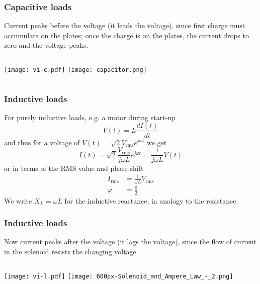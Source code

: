 \documentclass[10pt,aspectratio=169,dvipsnames]{beamer}
\begin{document}
\begin{frame}
  \frametitle{Capacitive loads}

  Current peaks before the voltage (it \alert{leads} the voltage),
  since first charge must accumulate on the plates; once the charge is
  on the plates, the current drops to zero and the voltage peaks.

  \begin{columns}
  \texttt{[image: vi-c.pdf]}
  \texttt{[image: capacitor.png]}
  \end{columns}
\end{frame}




\begin{frame}
  \frametitle{Inductive loads}

  For purely \alert{inductive loads}, e.g. a motor during start-up
  \begin{equation*}
    V(t) = L \frac{d I(t)}{dt}
  \end{equation*}
  and thus for a voltage of $V(t) = \sqrt{2} V_{\textrm{rms}}
  e^{j\omega t}$ we get
  \begin{equation*}
    I(t) = \sqrt{2} \frac{V_{\textrm{rms}}}{j\omega L} e^{j\omega t} = \frac{1}{j\omega L}V(t)
  \end{equation*}
  or in terms of the RMS value and phase shift
  \begin{align*}
    I_{\textrm{rms}} & = \frac{1}{\omega L} V_{\textrm{rms}} \\
    \varphi & = \frac{\pi}{2}
  \end{align*}
  We write $X_{L} = \omega L$ for the \alert{inductive reactance}, in analogy to the resistance.


\end{frame}



\begin{frame}
  \frametitle{Inductive loads}

  Now current peaks after the voltage (it \alert{lags} the voltage),
  since the flow of current in the solenoid resists the changing voltage.

  \begin{columns}
  \texttt{[image: vi-l.pdf]}
  \texttt{[image: 600px-Solenoid\_and\_Ampere\_Law\_-\_2.png]}
  \end{columns}
\end{frame}
\end{document}
